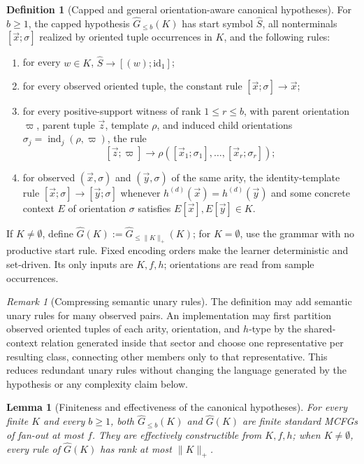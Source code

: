 \documentclass[11pt,a4paper]{article}
\numberwithin{equation}{section}
\theoremstyle{plain}
\newtheorem{lemma}[theorem]{Lemma}
\theoremstyle{definition}
\newtheorem{definition}[theorem]{Definition}
\theoremstyle{remark}
\newtheorem{remark}[theorem]{Remark}
\newcommand{\tuple}[1]{\vec{#1}}
\begin{document}
\begin{definition}[Capped and general orientation-aware canonical hypotheses]
\label{def:learner}
For \(b\ge1\), the capped hypothesis \(\widehat G_{\le b}(K)\) has start
symbol \(\widehat S\), all nonterminals \([\tuple x;\sigma]\) realized by
oriented tuple occurrences in \(K\), and the following rules:
\begin{enumerate}[label=(\roman*),leftmargin=*]
\item for every \(w\in K\),
      \(\widehat S\to[(w);\mathrm{id}_1]\);
\item for every observed oriented tuple, the constant rule
      \([\tuple x;\sigma]\to\tuple x\);
\item for every positive-support witness of rank \(1\le r\le b\), with
      parent orientation \(\varpi\), parent tuple \(\tuple z\), template \(\rho\),
      and induced child orientations
      \(\sigma_j=\operatorname{ind}_j(\rho,\varpi)\), the rule
      \[
        [\tuple z;\varpi]\to
        \rho([\tuple x_1;\sigma_1],\ldots,[\tuple x_r;\sigma_r]);
      \]
\item for observed \((\tuple x,\sigma)\) and \((\tuple y,\sigma)\) of the
      same arity, the identity-template rule
      \([\tuple x;\sigma]\to[\tuple y;\sigma]\) whenever
      \(h^{(d)}(\tuple x)=h^{(d)}(\tuple y)\) and some concrete context \(E\)
      of orientation \(\sigma\) satisfies
      \(E[\tuple x],E[\tuple y]\in K\).
\end{enumerate}
If \(K\ne\emptyset\), define
\(\widehat G(K):=\widehat G_{\le\|K\|_+}(K)\); for \(K=\emptyset\), use the
grammar with no productive start rule.  Fixed encoding orders make the learner
deterministic and set-driven.  Its only inputs are \(K,f,h\); orientations are
read from sample occurrences.
\end{definition}

\begin{remark}[Compressing semantic unary rules]
The definition may add semantic unary rules for many observed pairs.  An
implementation may first partition observed oriented tuples of each arity, orientation, and
\(h\)-type by the shared-context relation generated inside that sector and choose
one representative per resulting class, connecting other members only to that
representative.  This reduces redundant unary rules without changing the
language generated by the hypothesis or any complexity claim below.
\end{remark}

\begin{lemma}[Finiteness and effectiveness of the canonical hypotheses]
\label{lem:learner-effective}
For every finite \(K\) and every \(b\ge1\), both
\(\widehat G_{\le b}(K)\) and \(\widehat G(K)\) are finite standard MCFGs of
fan-out at most \(f\).  They are effectively constructible from \(K,f,h\);
when \(K\ne\emptyset\), every rule of \(\widehat G(K)\) has rank at most
\(\|K\|_+\).
\end{lemma}
\end{document}
